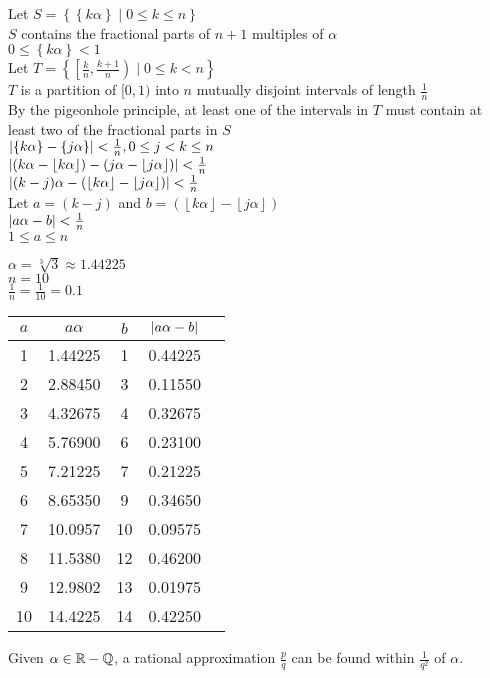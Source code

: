 \documentclass[letterpaper,12pt,fleqn]{article}
\renewcommand{\a}{\alpha}
\renewcommand{\c}{\checkmark}
\newcommand{\floor}[1]{\left\lfloor#1\right\rfloor}
\newcommand{\fpart}[1]{\left\{#1\right\}}
\begin{document}
\begin{theproof}
  Let $S=\left\{\fpart{k\a}\mid0\le k\le n\right\}$ \\
  $S$ contains the fractional parts of $n+1$ multiples of $\a$ \\
  $0\le\fpart{k\a}<1$ \\
  Let $T=\left\{\left[\frac{k}{n},\frac{k+1}{n}\right)\mid0\le k<n\right\}$ \\
  $T$ is a partition of $[0,1)$ into $n$ mutually disjoint intervals of length
      $\frac{1}{n}$ \\
  By the pigeonhole principle, at least one of the intervals in $T$ must
  contain at least two of the fractional parts in $S$ \\
  $\abs{\fpart{k\a}-\fpart{j\a}}<\frac{1}{n},0\le j<k\le n$ \\
  $\abs{\left(k\a-\floor{k\a}\right)-\left(j\a-\floor{j\a}\right)}<
      \frac{1}{n}$ \\
  $\abs{(k-j)\a-\left(\floor{k\a}-\floor{j\a}\right)}<\frac{1}{n}$ \\
  Let $a=(k-j)$ and $b=\left(\floor{k\a}-\floor{j\a}\right)$ \\
  $\abs{a\a-b}<\frac{1}{n}$ \\
  $1\le a\le n$
\end{theproof}

\begin{example}
  $\a=\sqrt[3]{3}\approx1.44225$ \\
  $n=10$ \\
  $\frac{1}{n}=\frac{1}{10}=0.1$

  \bigskip

  \begin{tabular}{c|c|c|cc}
    $a$ & $a\a$ & $b$ & $\abs{a\a-b}$ \\
    \hline
    1 & 1.44225 & 1 & 0.44225 \\
    2 & 2.88450 & 3 & 0.11550 \\
    3 & 4.32675 & 4 & 0.32675 \\
    4 & 5.76900 & 6 & 0.23100 \\
    5 & 7.21225 & 7 & 0.21225 \\
    6 & 8.65350 & 9 & 0.34650 \\
    7 & 10.0957 & 10 & 0.09575 & \c \\
    8 & 11.5380 & 12 & 0.46200 \\
    9 & 12.9802 & 13 & 0.01975 & \c \\
    10 & 14.4225 & 14 & 0.42250 \\
  \end{tabular}
\end{example}
\newpage
\begin{corollary}
  Given $\a\in\R-\Q$, a rational approximation $\frac{p}{q}$ can be found
  within $\frac{1}{q^2}$ of $\a$.
\end{corollary}
\end{document}
